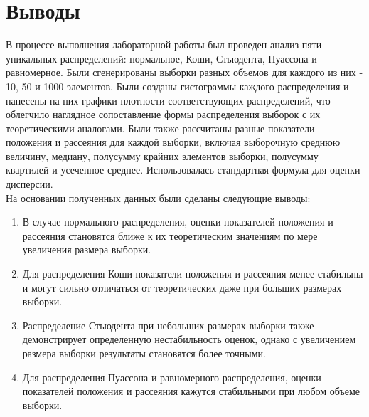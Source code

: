 \documentclass[12pt,a4paper]{article}
\begin{document}
	\newpage

	\section{Выводы}
	\vspace{2em}

	В процессе выполнения лабораторной работы был проведен анализ пяти уникальных распределений: нормальное, Коши, Стьюдента, Пуассона и равномерное.
	Были сгенерированы выборки разных объемов для каждого из них - 10, 50 и 1000 элементов.
	Были созданы гистограммы каждого распределения и нанесены на них графики плотности соответствующих распределений, что облегчило наглядное сопоставление формы распределения выборок с их теоретическими аналогами.
	Были также рассчитаны разные показатели положения и рассеяния для каждой выборки, включая выборочную среднюю величину, медиану, полусумму крайних элементов выборки, полусумму квартилей и усеченное среднее.
	Использовалась стандартная формула для оценки дисперсии. \\

	На основании полученных данных были сделаны следующие выводы:

	\begin{enumerate}
		\item В случае нормального распределения, оценки показателей положения и рассеяния становятся ближе к их теоретическим значениям по мере увеличения размера выборки.
		\item Для распределения Коши показатели положения и рассеяния менее стабильны и могут сильно отличаться от теоретических даже при больших размерах выборки.
		\item Распределение Стьюдента при небольших размерах выборки также демонстрирует определенную нестабильность оценок, однако с увеличением размера выборки результаты становятся более точными.
		\item Для распределения Пуассона и равномерного распределения, оценки показателей положения и рассеяния кажутся стабильными при любом объеме выборки. \\
	\end{enumerate}
\end{document}
